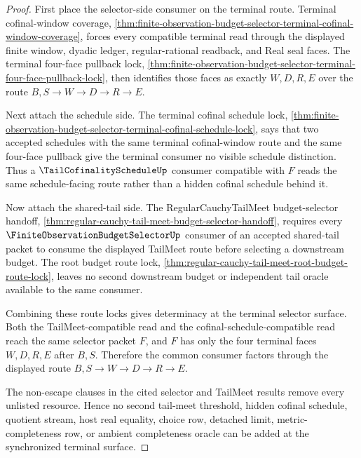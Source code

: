 \begin{proof}
First place the selector-side consumer on the terminal route. Terminal cofinal-window coverage, \autoref{thm:finite-observation-budget-selector-terminal-cofinal-window-coverage}, forces every compatible terminal read through the displayed finite window, dyadic ledger, regular-rational readback, and Real seal faces. The terminal four-face pullback lock, \autoref{thm:finite-observation-budget-selector-terminal-four-face-pullback-lock}, then identifies those faces as exactly $W,D,R,E$ over the route $B,S \to W \to D \to R \to E$.

Next attach the schedule side. The terminal cofinal schedule lock, \autoref{thm:finite-observation-budget-selector-terminal-cofinal-schedule-lock}, says that two accepted schedules with the same terminal cofinal-window route and the same four-face pullback give the terminal consumer no visible schedule distinction. Thus a $\TailCofinalityScheduleUp$ consumer compatible with $F$ reads the same schedule-facing route rather than a hidden cofinal schedule behind it.

Now attach the shared-tail side. The RegularCauchyTailMeet budget-selector handoff, \autoref{thm:regular-cauchy-tail-meet-budget-selector-handoff}, requires every $\FiniteObservationBudgetSelectorUp$ consumer of an accepted shared-tail packet to consume the displayed TailMeet route before selecting a downstream budget. The root budget route lock, \autoref{thm:regular-cauchy-tail-meet-root-budget-route-lock}, leaves no second downstream budget or independent tail oracle available to the same consumer.

Combining these route locks gives determinacy at the terminal selector surface. Both the TailMeet-compatible read and the cofinal-schedule-compatible read reach the same selector packet $F$, and $F$ has only the four terminal faces $W,D,R,E$ after $B,S$. Therefore the common consumer factors through the displayed route $B,S \to W \to D \to R \to E$.

The non-escape clauses in the cited selector and TailMeet results remove every unlisted resource. Hence no second tail-meet threshold, hidden cofinal schedule, quotient stream, host real equality, choice row, detached limit, metric-completeness row, or ambient completeness oracle can be added at the synchronized terminal surface.
\end{proof}

